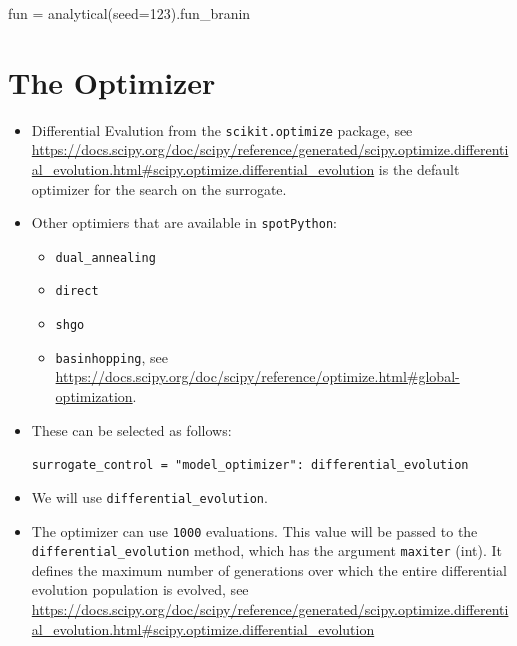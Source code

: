 \documentclass[
  letterpaper,
  DIV=11,
  numbers=noendperiod]{scrreprt}
\newenvironment{Shaded}{\begin{snugshade}}{\end{snugshade}}
\newcommand{\DecValTok}[1]{\textcolor[rgb]{0.68,0.00,0.00}{#1}}
\newcommand{\NormalTok}[1]{\textcolor[rgb]{0.00,0.23,0.31}{#1}}
\newcommand{\OperatorTok}[1]{\textcolor[rgb]{0.37,0.37,0.37}{#1}}
\providecommand{\tightlist}{%
  \setlength{\itemsep}{0pt}\setlength{\parskip}{0pt}}\usepackage{longtable,booktabs,array}
\begin{document}
\begin{Shaded}
\begin{Highlighting}[]
\NormalTok{fun }\OperatorTok{=}\NormalTok{ analytical(seed}\OperatorTok{=}\DecValTok{123}\NormalTok{).fun\_branin}
\end{Highlighting}
\end{Shaded}

\hypertarget{the-optimizer}{%
\section{The Optimizer}\label{the-optimizer}}

\begin{itemize}
\item
  Differential Evalution from the \texttt{scikit.optimize} package, see
  \url{https://docs.scipy.org/doc/scipy/reference/generated/scipy.optimize.differential_evolution.html\#scipy.optimize.differential_evolution}
  is the default optimizer for the search on the surrogate.
\item
  Other optimiers that are available in \texttt{spotPython}:

  \begin{itemize}
  \tightlist
  \item
    \texttt{dual\_annealing}
  \item
    \texttt{direct}
  \item
    \texttt{shgo}
  \item
    \texttt{basinhopping}, see
    \url{https://docs.scipy.org/doc/scipy/reference/optimize.html\#global-optimization}.
  \end{itemize}
\item
  These can be selected as follows:

  \texttt{surrogate\_control\ =\ "model\_optimizer":\ differential\_evolution}
\item
  We will use \texttt{differential\_evolution}.
\item
  The optimizer can use \texttt{1000} evaluations. This value will be
  passed to the \texttt{differential\_evolution} method, which has the
  argument \texttt{maxiter} (int). It defines the maximum number of
  generations over which the entire differential evolution population is
  evolved, see
  \url{https://docs.scipy.org/doc/scipy/reference/generated/scipy.optimize.differential_evolution.html\#scipy.optimize.differential_evolution}
\end{itemize}
\end{document}
